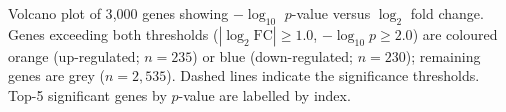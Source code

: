 \caption{Volcano plot of 3{,}000 genes showing $-\log_{10}$ $p$-value versus $\log_2$ fold change.
Genes exceeding both thresholds ($|\log_2\text{FC}| \geq 1.0$, $-\log_{10}p \geq 2.0$) are coloured
orange (up-regulated; $n = 235$) or blue (down-regulated; $n = 230$); remaining genes are grey
($n = 2{,}535$). Dashed lines indicate the significance thresholds.
Top-5 significant genes by $p$-value are labelled by index.}
